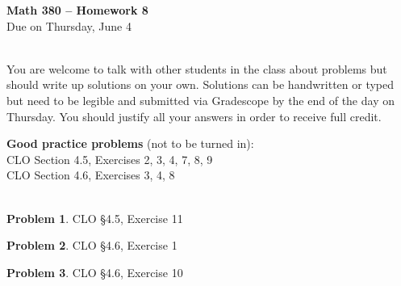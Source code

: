 \documentclass[12pt]{amsart}
\theoremstyle{definition}
\newtheorem{prob}{Problem}
\begin{document}
 \thispagestyle{empty}
\begin{center} {\large \textbf{Math 380 -- Homework 8}} \smallskip \\ 
Due on Thursday, June 4 \\ \ \\
 \end{center}

You are welcome to talk with other students in the class about problems but should write up solutions on your own. 
Solutions can be handwritten or typed but need to be legible and submitted via Gradescope by the end of the day 
on Thursday. You should justify all your answers in order to receive full credit.  
\bigskip 

\begin{flushleft}

{\bf Good practice problems} (not to be turned in): \\

CLO Section 4.5, Exercises 2, 3, 4, 7, 8, 9 \\
CLO Section 4.6, Exercises 3, 4, 8\\
\ \ \\
\bigskip 




\begin{prob} CLO \S4.5, Exercise 11  \smallskip  \\
\end{prob}

\bigskip 

\begin{prob}  CLO \S4.6, Exercise 1 \smallskip \\
\end{prob}

\bigskip 
\begin{prob}  CLO \S4.6, Exercise 10 \smallskip \\
\end{prob}

\bigskip 


\end{flushleft}
\end{document}
